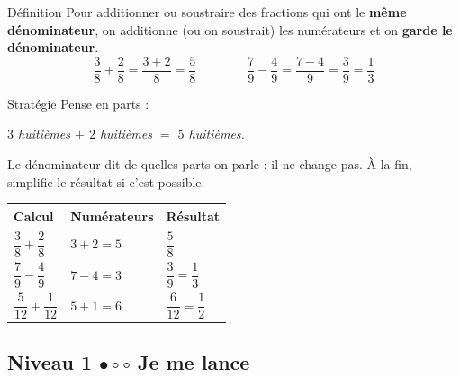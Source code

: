 \begin{regle}{Définition}
Pour \textcolor{themeColor}{additionner} ou \textcolor{themeColor}{soustraire} des fractions qui ont le \textbf{même dénominateur}, on additionne (ou on soustrait) les numérateurs et on \textbf{garde le dénominateur}.
\[\dfrac{3}{8}+\dfrac{2}{8}=\dfrac{3+2}{8}=\dfrac{5}{8} \qquad\qquad \dfrac{7}{9}-\dfrac{4}{9}=\dfrac{7-4}{9}=\dfrac{3}{9}=\dfrac{1}{3}\]
\end{regle}
 
\vspace{20pt}
\begin{astuce}{Stratégie}
Pense en parts :
 
\vspace{5pt}
{\centering\textit{$3$ huitièmes $+$ $2$ huitièmes $=$ $5$ huitièmes.}\par}
 
\vspace{5pt}
Le dénominateur dit de quelles parts on parle : il ne change pas. À la fin, simplifie le résultat si c'est possible.
\end{astuce}
 
\vspace{20pt}
\def\arraystretch{3}
\begin{tabularx}{\linewidth}{|>{\centering\arraybackslash}X|>{\centering\arraybackslash}X|>{\centering\arraybackslash}X|}
\hline
\cellcolor{themeNO!30}\textbf{Calcul} & \cellcolor{themeNO!30}\textbf{Numérateurs} & \cellcolor{themeNO!30}\textbf{Résultat} \\\hline
$\dfrac{3}{8}+\dfrac{2}{8}$ & $3+2=5$ & $\dfrac{5}{8}$ \\\hline
$\dfrac{7}{9}-\dfrac{4}{9}$ & $7-4=3$ & $\dfrac{3}{9}=\dfrac{1}{3}$ \\\hline
$\dfrac{5}{12}+\dfrac{1}{12}$ & $5+1=6$ & $\dfrac{6}{12}=\dfrac{1}{2}$ \\\hline
\end{tabularx}
\def\arraystretch{1}
 
 
\newpage
\subsection{Niveau 1 \quad $\bullet\circ\circ$ \quad Je me lance}
 
 
